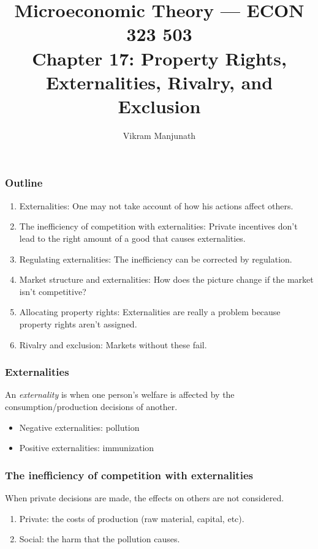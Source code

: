 \documentclass[xcolor=pdftex,dvipsnames]{beamer}
\title{Microeconomic Theory --- ECON 323 503 \\ Chapter 17: Property
  Rights, Externalities, Rivalry, and Exclusion}
\author{Vikram Manjunath}       %
\institute{Texas A\&M University}
\begin{document}
\maketitle

\begin{frame}
\frametitle{Outline}
\begin{enumerate}[<+->]
\item Externalities: One may not take account of how his actions
  affect others.
\item The inefficiency of competition with externalities: Private
  incentives don't lead to the right amount of a good that causes externalities.
\item Regulating externalities: The inefficiency can be corrected by regulation.
\item Market structure and externalities: How does the picture change
  if the market isn't competitive?
\item Allocating property rights: Externalities are really a problem
  because property rights aren't assigned.
\item Rivalry and exclusion: Markets without these fail.
\end{enumerate}
\end{frame}


\begin{frame}
  \frametitle{Externalities}
  An \emph{externality} is when one person's welfare is affected by
  the consumption/production decisions of another.
\bigskip

\bigskip

\begin{itemize}
\item<4-> Negative externalities: pollution
\item<5-> Positive externalities: immunization
\end{itemize}

\end{frame}

\begin{frame}
  \frametitle{The inefficiency of competition with externalities}
  When private decisions are made, the effects on others are not
  considered.

\bigskip
{}



\bigskip

\begin{enumerate}
\item<5-> Private: the costs of production (raw material, capital, etc).
\item<6-> Social: the harm that the pollution causes.
\end{enumerate}

\end{frame}
\end{document}

